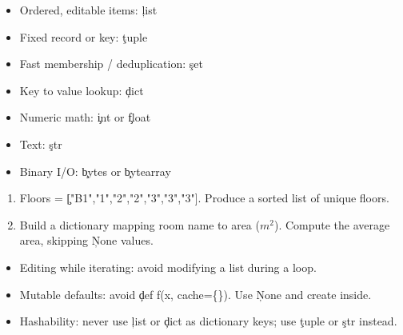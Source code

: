 \begin{itemize}
    \item Ordered, editable items: \c{list}
    \item Fixed record or key: \c{tuple}
    \item Fast membership / deduplication: \c{set}
    \item Key to value lookup: \c{dict}
    \item Numeric math: \c{int} or \c{float}
    \item Text: \c{str}
    \item Binary I/O: \c{bytes} or \c{bytearray}
\end{itemize}

\begin{enumerate}
    \item Floors = \c{["B1","1","2","2","3","3","3"]}. Produce a sorted list of unique floors.
    \item Build a dictionary mapping room name to area ($m^2$). Compute the average area, skipping \c{None} values.
\end{enumerate}

\begin{itemize}
    \item Editing while iterating: avoid modifying a list during a loop.
    \item Mutable defaults: avoid \c{def f(x, cache=\{\})}. Use \c{None} and create inside.
    \item Hashability: never use \c{list} or \c{dict} as dictionary keys; use \c{tuple} or \c{str} instead.
\end{itemize}
